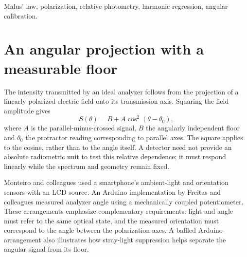 \begin{abstract}
A settled-angle polarization experiment separates the angular response of an analyzer from the arbitrary scale of a light sensor. Ten paired example observations are compared with continuous light plateaux at the same protractor settings. A harmonic fit to the plateau means gives an amplitude of 1020.44 counts, a floor of 13.04 counts and an angular-zero estimate of 0.012 degrees. The root-mean-square residual decreases from 7.13 counts for individual snapshots to 0.51 counts for interior means. These estimates explain the positive residuals obtained when an independently specified parallel reference is used; angular accuracy is set by the angle reference, while the crossed-analyzer floor combines several optical and detector contributions.
\end{abstract}
\begin{IEEEkeywords}
Malus' law, polarization, relative photometry, harmonic regression, angular calibration.
\end{IEEEkeywords}

\section{An angular projection with a measurable floor}
The intensity transmitted by an ideal analyzer follows from the projection of a linearly polarized electric field onto its transmission axis. Squaring the field amplitude gives
\begin{equation}
 S(\theta)=B+A\cos^2(\theta-\theta_0),
 \label{eq:malus-law-model}
\end{equation}
where $A$ is the parallel-minus-crossed signal, $B$ the angularly independent floor and $\theta_0$ the protractor reading corresponding to parallel axes. The square applies to the cosine, rather than to the angle itself. A detector need not provide an absolute radiometric unit to test this relative dependence; it must respond linearly while the spectrum and geometry remain fixed.

Monteiro and colleagues used a smartphone's ambient-light and orientation sensors with an LCD source\cite{monteiro2017malus}. An Arduino implementation by Freitas and colleagues measured analyzer angle using a mechanically coupled potentiometer\cite{freitas2018malus}. These arrangements emphasize complementary requirements: light and angle must refer to the same optical state, and the measured orientation must correspond to the angle between the polarization axes. A baffled Arduino arrangement also illustrates how stray-light suppression helps separate the angular signal from its floor\cite{onder2021malus}.

